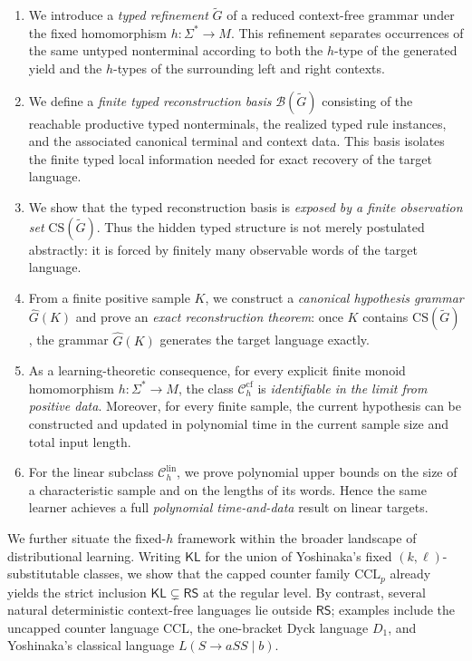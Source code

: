 \documentclass[11pt,a4paper]{article}
\newcommand{\CS}{\mathrm{CS}}
\newcommand{\cf}{\mathrm{cf}}
\newcommand{\lin}{\mathrm{lin}}
\newcommand{\Ccf}[1]{\mathcal C_{#1}^{\cf}}
\newcommand{\Clin}[1]{\mathcal C_{#1}^{\lin}}
\begin{document}
\begin{enumerate}[label=\textup{(\arabic*)},leftmargin=2.4em]
\item We introduce a \emph{typed refinement} $\widetilde G$ of a reduced
context-free grammar under the fixed homomorphism $h:\Sigma^*\to M$.
This refinement separates occurrences of the same untyped nonterminal
according to both the $h$-type of the generated yield and the $h$-types
of the surrounding left and right contexts.

\item We define a \emph{finite typed reconstruction basis}
$\mathcal B(\widetilde G)$ consisting of the reachable productive typed
nonterminals, the realized typed rule instances, and the associated
canonical terminal and context data. This basis isolates the finite typed
local information needed for exact recovery of the target language.

\item We show that the typed reconstruction basis is \emph{exposed by a
finite observation set} $\CS(\widetilde G)$. Thus the hidden typed
structure is not merely postulated abstractly: it is forced by finitely
many observable words of the target language.

\item From a finite positive sample $K$, we construct a \emph{canonical
hypothesis grammar} $\hat G(K)$ and prove an \emph{exact reconstruction
theorem}: once $K$ contains $\CS(\widetilde G)$, the grammar $\hat G(K)$
generates the target language exactly.

\item As a learning-theoretic consequence, for every explicit finite
monoid homomorphism $h:\Sigma^*\to M$, the class $\Ccf{h}$ is
\emph{identifiable in the limit from positive data}. Moreover, for every
finite sample, the current hypothesis can be constructed and updated in
polynomial time in the current sample size and total input length.

\item For the linear subclass $\Clin{h}$, we prove polynomial upper
bounds on the size of a characteristic sample and on the lengths of its
words. Hence the same learner achieves a full \emph{polynomial
time-and-data} result on linear targets.
\end{enumerate}

We further situate the fixed-$h$ framework within the broader landscape of distributional learning. Writing $\mathsf{KL}$ for the union of Yoshinaka's fixed $(k,\ell)$-substitutable classes, we show that the capped counter family $\mathrm{CCL}_p$ already yields the strict inclusion $\mathsf{KL}\subsetneq\mathsf{RS}$ at the regular level. By contrast, several natural deterministic context-free languages lie outside $\mathsf{RS}$; examples include the uncapped counter language $\mathrm{CCL}$, the one-bracket Dyck language $D_1$, and Yoshinaka's classical language $L(S\to aSS\mid b)$.
\end{document}
